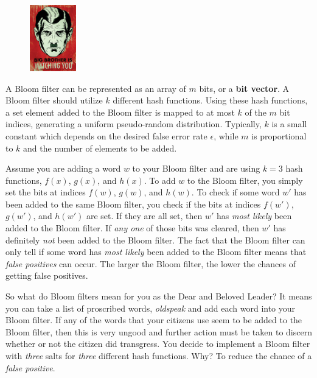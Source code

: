\begin{figure}
\centering
\includegraphics[width=0.18\textwidth]{images/1984-Big-Brother.jpg}
\end{figure}

A Bloom filter can be represented as an array of $m$ bits, or a
\textbf{bit vector}. A Bloom filter should utilize $k$ different hash
functions. Using these hash functions, a set element added to the Bloom
filter is mapped to at most $k$ of the $m$ bit indices, generating a
uniform pseudo-random distribution. Typically, $k$ is a small constant
which depends on the desired false error rate $\epsilon$, while $m$ is
proportional to $k$ and the number of elements to be added.

Assume you are adding a word $w$ to your Bloom filter and are using
$k=3$ hash functions, $f(x)$, $g(x)$, and $h(x)$. To add $w$ to the
Bloom filter, you simply set the bits at indices $f(w)$, $g(w)$, and
$h(w)$. To check if some word $w'$ has been added to the same Bloom
filter, you check if the bits at indices $f(w')$, $g(w')$, and $h(w')$
are set. If they are all set, then $w'$ has \emph{most likely} been
added to the Bloom filter. If \emph{any one} of those bits was cleared,
then $w'$ has definitely \emph{not} been added to the Bloom filter. The
fact that the Bloom filter can only tell if some word has \emph{most
likely} been added to the Bloom filter means that \emph{false positives}
can occur. The larger the Bloom filter, the lower the chances of getting
false positives.

So what do Bloom filters mean for you as the Dear and Beloved Leader?
It means you can take a list of proscribed words, \emph{oldspeak} and
add each word into your Bloom filter. If any of the words that your
citizens use seem to be added to the Bloom filter, then this is very
ungood and further action must be taken to discern whether or not the
citizen did transgress. You decide to implement a Bloom filter with
\emph{three} salts for \emph{three} different
hash functions. Why? To reduce the chance of a \emph{false positive}.

